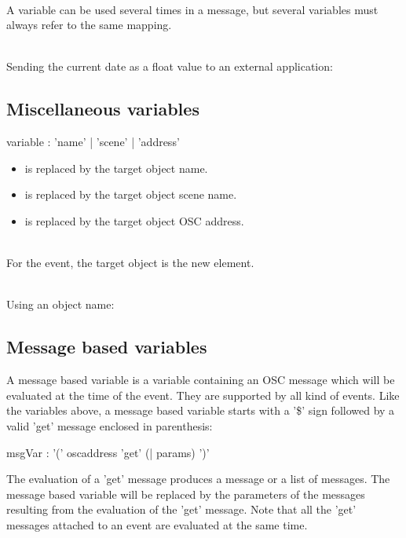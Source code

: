 \documentclass[a4paper,twoside]{report}
\newcommand{\subsublevel}[1]	{\subsection{#1}}
\begin{document}
\note{} \\
A variable can be used several times in a message, but several  variables must always refer to the same mapping.

\example \\
Sending the current date as a float value to an external application:\\

\subsublevel{Miscellaneous variables}
\label{miscvar}


\begin{rail} 
variable :  'name' | 'scene' | 'address'
\end{rail}

\begin{itemize}
\item {} is replaced by the target object name.
\item {} is replaced by the target object scene name.
\item {} is replaced by the target object OSC address. 
\end{itemize}

\note{} \\
For the  event, the target object is the new element. 

\example \\
Using an object name:

\subsublevel{Message based variables}
\label{msgvar}

A message based variable is a variable containing an OSC message which will be evaluated at the time of the event. They are supported by all kind of events. Like  the variables above, a message based variable starts with a '\$' sign followed by a valid 'get' message enclosed in parenthesis:
\begin{rail} 
msgVar : '(' oscaddress 'get' (| params) ')'
\end{rail}

The evaluation of a 'get' message produces a message or a list of messages. The message based variable will be replaced by the parameters of the messages resulting from the evaluation of the 'get' message.
Note that all the 'get' messages attached to an event are evaluated at the same time.
\end{document}
